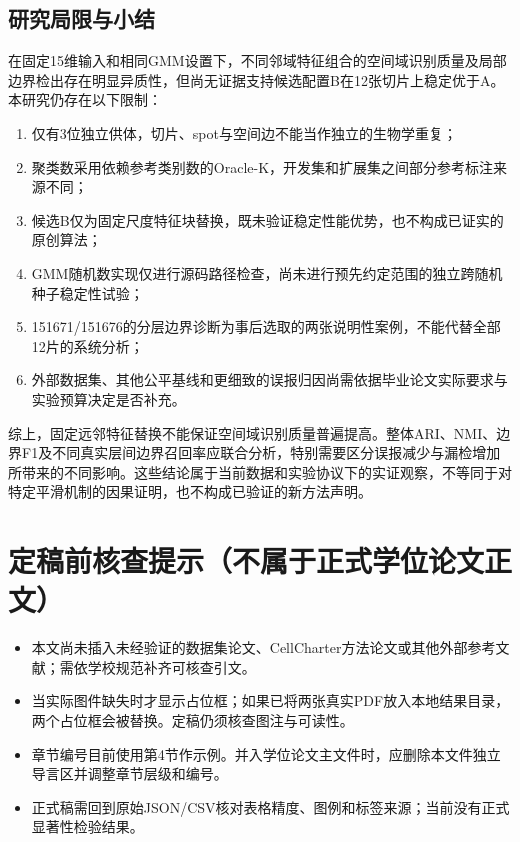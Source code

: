\documentclass[UTF8,a4paper,12pt]{ctexart}
\begin{document}
\subsection{研究局限与小结}
\label{subsec:limitations}
在固定15维输入和相同GMM设置下，不同邻域特征组合的空间域识别质量及局部边界检出存在明显异质性，但尚无证据支持候选配置B在12张切片上稳定优于A。本研究仍存在以下限制：

\begin{enumerate}
 \item 仅有3位独立供体，切片、spot与空间边不能当作独立的生物学重复；
 \item 聚类数采用依赖参考类别数的Oracle-K，开发集和扩展集之间部分参考标注来源不同；
 \item 候选B仅为固定尺度特征块替换，既未验证稳定性能优势，也不构成已证实的原创算法；
 \item GMM随机数实现仅进行源码路径检查，尚未进行预先约定范围的独立跨随机种子稳定性试验；
 \item 151671/151676的分层边界诊断为事后选取的两张说明性案例，不能代替全部12片的系统分析；
 \item 外部数据集、其他公平基线和更细致的误报归因尚需依据毕业论文实际要求与实验预算决定是否补充。
\end{enumerate}

综上，固定远邻特征替换不能保证空间域识别质量普遍提高。整体ARI、NMI、边界F1及不同真实层间边界召回率应联合分析，特别需要区分误报减少与漏检增加所带来的不同影响。这些结论属于当前数据和实验协议下的实证观察，不等同于对特定平滑机制的因果证明，也不构成已验证的新方法声明。

\section*{定稿前核查提示（不属于正式学位论文正文）}
\begin{itemize}
  \item 本文尚未插入未经验证的数据集论文、CellCharter方法论文或其他外部参考文献；需依学校规范补齐可核查引文。
  \item 当实际图件缺失时才显示占位框；如果已将两张真实PDF放入本地结果目录，两个占位框会被替换。定稿仍须核查图注与可读性。
  \item 章节编号目前使用第4节作示例。并入学位论文主文件时，应删除本文件独立导言区并调整章节层级和编号。
  \item 正式稿需回到原始JSON/CSV核对表格精度、图例和标签来源；当前没有正式显著性检验结果。
\end{itemize}
\end{document}
